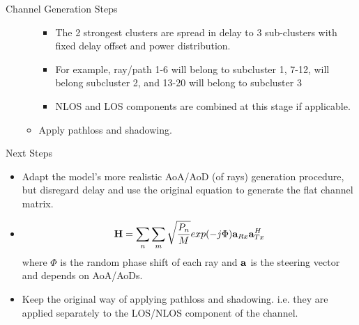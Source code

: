 \documentclass{beamer}
\begin{document}
\begin{frame}[allowframebreaks]{Channel Generation Steps}
\begin{itemize}
\begin{itemize}
    \begin{itemize}
        \item The 2 strongest clusters are spread in delay to 3 sub-clusters with fixed delay offset and power distribution.
        \item For example, ray/path 1-6 will belong to subcluster 1, 7-12, will belong subcluster 2, and 13-20 will belong to subcluster 3
        \item NLOS and LOS components are combined at this stage if applicable.
    \end{itemize}
    \item Apply pathloss and shadowing.
\end{itemize}

\end{itemize}
\end{frame}
\begin{frame}{Next Steps}
    \begin{itemize}
        \item Adapt the model's more realistic AoA/AoD (of rays) generation procedure, but disregard delay and use the original equation to generate the flat channel matrix.
        \item $${\bf H} =  \sum_n \sum_m\sqrt{\frac{P_n}{M}} exp(-j\Phi){\bf a}_{Rx}{\bf a}_{Tx}^H$$
        where $\Phi$ is the random phase shift of each ray and ${\bf a}$ is the steering vector and depends on AoA/AoDs.
        \item Keep the original way of applying pathloss and shadowing. i.e. they are applied separately to the LOS/NLOS component of the channel.
    \end{itemize}
\end{frame}


\end{document}
